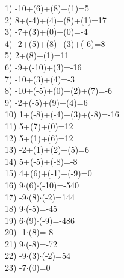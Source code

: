 \documentclass[a4paper,10pt]{article}
\begin{document}
1)   -10+(6)+(8)+(1)=5
\vspace{0.5cm}\\2)   8+(-4)+(4)+(8)+(1)=17
\vspace{0.5cm}\\3)   -7+(3)+(0)+(0)=-4
\vspace{0.5cm}\\4)   -2+(5)+(8)+(3)+(-6)=8
\vspace{0.5cm}\\5)   2+(8)+(1)=11
\vspace{0.5cm}\\6)   -9+(-10)+(3)=-16
\vspace{0.5cm}\\7)   -10+(3)+(4)=-3
\vspace{0.5cm}\\8)   -10+(-5)+(0)+(2)+(7)=-6
\vspace{0.5cm}\\9)   -2+(-5)+(9)+(4)=6
\vspace{0.5cm}\\10)   1+(-8)+(-4)+(3)+(-8)=-16
\vspace{0.5cm}\\11)   5+(7)+(0)=12
\vspace{0.5cm}\\12)   5+(1)+(6)=12
\vspace{0.5cm}\\13)   -2+(1)+(2)+(5)=6
\vspace{0.5cm}\\14)   5+(-5)+(-8)=-8
\vspace{0.5cm}\\15)   4+(6)+(-1)+(-9)=0
\vspace{0.5cm}\\16)   9$\cdot$(6)$\cdot$(-10)=-540
\vspace{0.5cm}\\17)   -9$\cdot$(8)$\cdot$(-2)=144
\vspace{0.5cm}\\18)   9$\cdot$(-5)=-45
\vspace{0.5cm}\\19)   6$\cdot$(9)$\cdot$(-9)=-486
\vspace{0.5cm}\\20)   -1$\cdot$(8)=-8
\vspace{0.5cm}\\21)   9$\cdot$(-8)=-72
\vspace{0.5cm}\\22)   -9$\cdot$(3)$\cdot$(-2)=54
\vspace{0.5cm}\\23)   -7$\cdot$(0)=0
\end{document}
